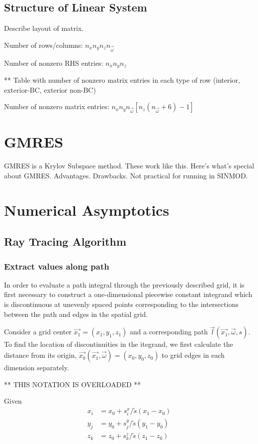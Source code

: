\subsection{Structure of Linear System}

Describe layout of matrix.

Number of rows/columns: $n_xn_yn_zn_{\vec{\omega}}$

Number of nonzero RHS entries: $n_xn_yn_z$

** Table with number of nonzero matrix entries in each type of row (interior,
exterior-BC, exterior non-BC)

Number of nonzero matrix entries: $n_xn_yn_{\vec{\omega}} \left[n_z(n_{\vec{\omega}}+6)-1 \right]$

\section{GMRES}
GMRES is a Krylov Subspace method. These work like this. Here's what's special
about GMRES. Advantages. Drawbacks. Not practical for running in SINMOD.

\section{Numerical Asymptotics}

\subsection{Ray Tracing Algorithm}
\subsubsection{Extract values along path}

In order to evaluate a path integral through the previously described grid, it
is first necessary to construct a one-dimensional piecewise constant integrand
which is discontinuous at unevenly spaced points corresponding to the
intersections between the path and edges in the spatial grid.

Consider a grid center $\vec{x_1} = (x_1,y_1,z_1)$ and a corresponding path $\vec{l}(\vec{x_1}, \vec{\omega}, s)$.
To find the location of discontinuities in the itegrand, we first calculate the
distance from its origin, $\vec{x_0}(\vec{x_1}, \vec{\omega}) = (x_0, y_0, z_0)$ to grid edges in each dimension
separately.


** THIS NOTATION IS OVERLOADED **

Given
\begin{align}
  x_i &= x_0 + s_i^x/\tilde{s}(x_1-x_0) \\
  y_j &= y_0 + s_j^y/\tilde{s}(y_1-y_0) \\
  z_k &= z_0 + s_k^z/\tilde{s}(z_1-z_0)
\end{align}

